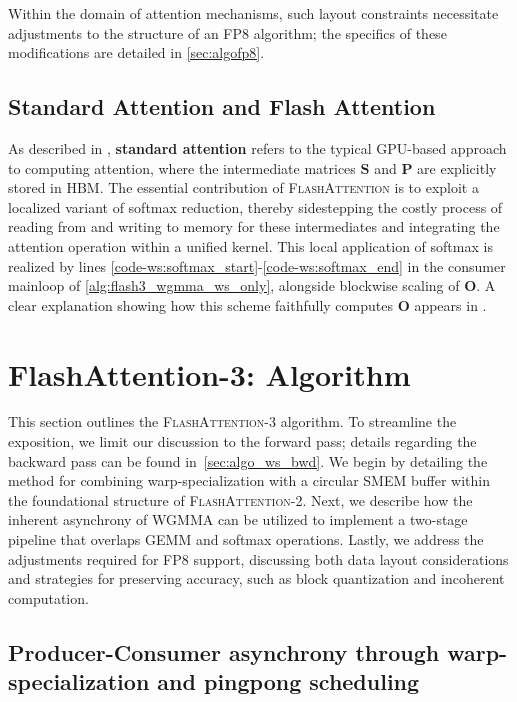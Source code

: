 Within the domain of attention mechanisms, such layout constraints necessitate adjustments to the structure of an FP8 algorithm; the specifics of these modifications are detailed in \cref{sec:algofp8}.

\subsection{Standard Attention and Flash Attention} As described in \citet{dao2022flashattention}, \textbf{standard attention} refers to the typical GPU-based approach to computing attention, where the intermediate matrices $\mathbf{S}$ and $\mathbf{P}$ are explicitly stored in HBM. The essential contribution of \textsc{FlashAttention} is to exploit a localized variant of softmax reduction, thereby sidestepping the costly process of reading from and writing to memory for these intermediates and integrating the attention operation within a unified kernel. This local application of softmax is realized by lines \ref{code-ws:softmax_start}-\ref{code-ws:softmax_end} in the consumer mainloop of \cref{alg:flash3_wgmma_ws_only}, alongside blockwise scaling of $\mathbf{O}$. A clear explanation showing how this scheme faithfully computes $\mathbf{O}$ appears in \cite[\S 2.3.1]{dao2023flashattention2}.

\section{FlashAttention-3: Algorithm}
\label{sec:algo}

This section outlines the \textsc{FlashAttention-3} algorithm. To streamline the exposition, we limit our discussion to the forward pass; details regarding the backward pass can be found in~\cref{sec:algo_ws_bwd}. We begin by detailing the method for combining warp-specialization with a circular SMEM buffer within the foundational structure of \textsc{FlashAttention-2}. Next, we describe how the inherent asynchrony of WGMMA can be utilized to implement a two-stage pipeline that overlaps GEMM and softmax operations. Lastly, we address the adjustments required for FP8 support, discussing both data layout considerations and strategies for preserving accuracy, such as block quantization and incoherent computation.

\subsection{Producer-Consumer asynchrony through warp-specialization and pingpong scheduling}
\label{sec:algo_ws}

